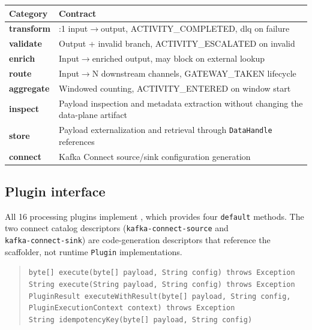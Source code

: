 \begin{longtable}{|>{\raggedright\arraybackslash}p{}|>{\raggedright\arraybackslash}p{}|}
\hline
\rowcolor[gray]{0.9}\textbf{Category} & \textbf{Contract} \\
\hline
\textbf{transform} & 1:1 input$\to$output, ACTIVITY\_COMPLETED, dlq on failure \\
\textbf{validate} & Output + invalid branch, ACTIVITY\_ESCALATED on invalid \\
\textbf{enrich} & Input$\to$enriched output, may block on external lookup \\
\textbf{route} & Input$\to$N downstream channels, GATEWAY\_TAKEN lifecycle \\
\textbf{aggregate} & Windowed counting, ACTIVITY\_ENTERED on window start \\
\textbf{inspect} & Payload inspection and metadata extraction without changing the data-plane artifact \\
\textbf{store} & Payload externalization and retrieval through \texttt{DataHandle} references \\
\textbf{connect} & Kafka Connect source/sink configuration generation \\
\hline
\end{longtable}

\subsection{Plugin interface}

All 16 processing plugins implement ,
which provides four \texttt{default} methods. The two connect catalog descriptors
(\texttt{kafka-connect-source} and \\ \texttt{kafka-connect-sink}) are code-generation
descriptors that reference the scaffolder, not runtime \texttt{Plugin}
implementations.

\begin{quote}
\texttt{byte[] execute(byte[] payload, String config) throws Exception} \\
\texttt{String execute(String payload, String config) throws Exception} \\
\texttt{PluginResult executeWithResult(byte[] payload, String config, PluginExecutionContext context) throws Exception} \\
\texttt{String idempotencyKey(byte[] payload, String config)}
\end{quote}

